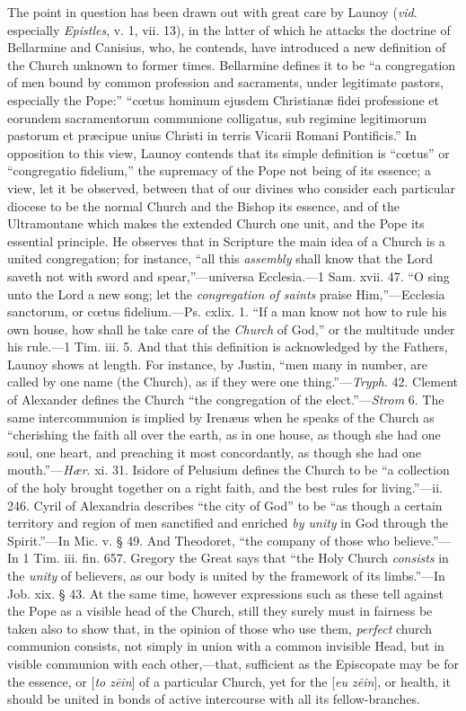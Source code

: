 The point in question has been drawn out with
great care by Launoy (\emph{vid}. especially \emph{Epistles}, v. 1,
vii. 13), in the latter of which he attacks the doctrine of Bellarmine
and Canisius, who, he contends, have introduced a new definition of
the Church unknown to former times. Bellarmine defines it to be ``a
congregation of men bound by common profession and sacraments, under
legitimate pastors, especially the Pope:'' ``cœtus hominum ejusdem
Christianæ fidei professione et eorundem sacramentorum communione
colligatus, sub regimine legitimorum pastorum et præcipue unius
Christi in terris Vicarii Romani Pontificis.'' In opposition to this
view, Launoy contends that its simple definition is ``cœtus'' or ``congregatio
fidelium,'' the supremacy of the Pope not being of its essence; a view,
let it be observed, between that of our divines who consider each
particular diocese to be the normal Church and the Bishop its essence,
and of the Ultramontane which makes the extended Church one unit, and
the Pope its essential principle. He observes that in Scripture the
main idea of a Church is a united congregation; for instance, ``all
this \emph{assembly} shall know that the Lord saveth not with sword
and spear,''—universa Ecclesia.—1 Sam. xvii. 47. ``O sing unto the
Lord a new song; let the \emph{congregation of saints} praise Him,''—Ecclesia
sanctorum, or cœtus fidelium.—Ps. cxlix. 1. ``If a man know not how
to rule his own house, how shall he take care of the \emph{Church} of
God,'' or the multitude under his rule.—1 Tim. iii. 5. And that this
definition is acknowledged by the Fathers, Launoy shows at length. For
instance, by Justin, ``men many in number, are called by one name (the
Church), as if they were one thing.''—\emph{Tryph}. 42. Clement of
Alexander defines the Church ``the congregation of the elect.''—\emph{Strom}
6. The same intercommunion is implied by Irenæus when he speaks of
the Church as ``cherishing the faith all over the earth, as in one
house, as though she had one soul, one heart, and preaching it most
concordantly, as though she had one mouth.''—\emph{Hær}. xi. 31.
Isidore of Pelusium defines the Church to be ``a collection of the holy
brought together on a right faith, and the best rules for living.''—ii.
246. Cyril of Alexandria describes ``the city of God'' to be ``as though
a certain territory and region of men sanctified and enriched \emph{by
unity} in God through the Spirit.''—In Mic. v. § 49. And
Theodoret, ``the company of those who believe.''—In 1 Tim. iii. fin.
657. Gregory the Great says that ``the Holy Church \emph{consists} in
the \emph{unity} of believers, as our body is united by the framework
of its limbs.''—In Job. xix. § 43. At the same time, however expressions such as these tell against the Pope as a visible head of
the Church, still they surely must in fairness be taken also to show
that, in the opinion of those who use them, \emph{perfect} church
communion consists, not simply in union with a common invisible Head,
but in visible communion with each other,—that, sufficient as the
Episcopate may be for the essence, or [\emph{to z\={e}in}] of a
particular Church, yet for the [\emph{eu z\={e}in}], or health, it
should be united in bonds of active intercourse with all its
fellow-branches.

